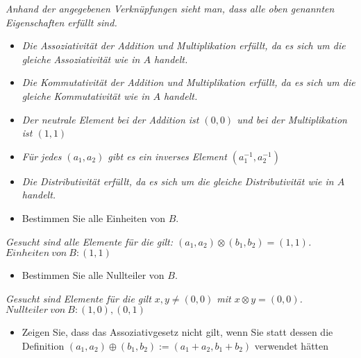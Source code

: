 \textit{Anhand der angegebenen Verknüpfungen sieht man, dass alle oben genannten Eigenschaften erfüllt sind.}

\begin{itemize}[leftmargin=*]
\item \textit{Die Assoziativität der Addition und Multiplikation erfüllt, da es sich um die gleiche Assoziativität wie in $A$ handelt.}
\item \textit{Die Kommutativität der Addition und Multiplikation erfüllt, da es sich um die gleiche Kommutativität wie in $A$ handelt.}
\item \textit{Der neutrale Element bei der Addition ist $(0,0)$ und bei der Multiplikation ist $(1,1)$}
\item \textit{Für jedes $(a_1,a_2)$ gibt es ein inverses Element $(a_1^{-1}, a_2^{-1})$}
\item \textit{Die Distributivität erfüllt, da es sich um die gleiche Distributivität wie in $A$ handelt.}
\end{itemize}

\newpage

\begin{itemize}[leftmargin=*, label={b)}]
\item Bestimmen Sie alle Einheiten von $B$.
\end{itemize}

\textit{Gesucht sind alle Elemente für die gilt: $(a_1,a_2) \otimes (b_1,b_2) = (1,1)$.}\\

$Einheiten \ von \ B: (1,1)$\\

\begin{itemize}[leftmargin=*, label={c)}]
\item Bestimmen Sie alle Nullteiler von $B$.
\end{itemize}

\textit{Gesucht sind Elemente für die gilt $x,y \neq (0,0)$ mit $x \otimes y = (0,0)$.}\\

$Nullteiler \ von \ B: (1,0), (0,1)$\\

\begin{itemize}[leftmargin=*, label={d)}]
\item Zeigen Sie, dass das Assoziativgesetz nicht gilt, wenn Sie statt dessen die Definition $(a_1, a_2) \oplus (b_1, b_2) := (a_1 + a_2, b_1 + b_2)$ verwendet hätten
\end{itemize}

